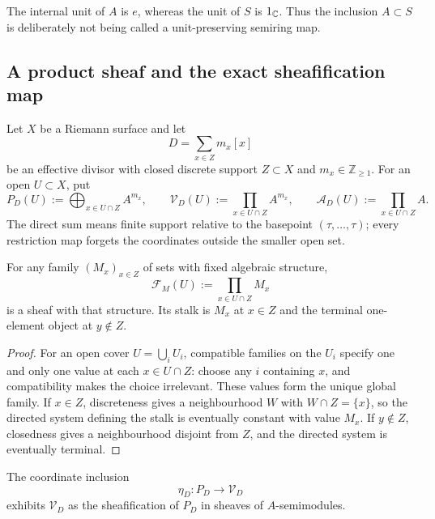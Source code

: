 The internal unit of $A$ is $e$, whereas the unit of $S$ is $1_{\mathbb C}$.  Thus the
inclusion $A\subset S$ is deliberately not being called a unit-preserving semiring
map.

\subsection{A product sheaf and the exact sheafification map}

Let $X$ be a Riemann surface and let
\[
 D=\sum_{x\in Z}m_x[x]
\]
be an effective divisor with closed discrete support $Z\subset X$ and
$m_x\in\mathbb Z_{\geq1}$.  For an open $U\subset X$, put
\[
 P_D(U):=\bigoplus_{x\in U\cap Z}A^{m_x},
 \qquad
 \mathcal V_D(U):=\prod_{x\in U\cap Z}A^{m_x},
 \qquad
 \mathcal A_D(U):=\prod_{x\in U\cap Z}A.
\]
The direct sum means finite support relative to the basepoint
$(\tau,\ldots,\tau)$; every restriction map forgets the coordinates outside the
smaller open set.

\begin{lemma}
\label{lem:ds-product-sheaf}
For any family $(M_x)_{x\in Z}$ of sets with fixed algebraic structure,
\[
 \mathcal F_M(U):=\prod_{x\in U\cap Z}M_x
\]
is a sheaf with that structure.  Its stalk is $M_x$ at $x\in Z$ and the terminal
one-element object at $y\notin Z$.
\end{lemma}

\begin{proof}
For an open cover $U=\bigcup_iU_i$, compatible families on the $U_i$ specify
one and only one value at each $x\in U\cap Z$: choose any $i$ containing $x$,
and compatibility makes the choice irrelevant.  These values form the unique
global family.  If $x\in Z$, discreteness gives a neighbourhood $W$ with
$W\cap Z=\{x\}$, so the directed system defining the stalk is eventually
constant with value $M_x$.  If $y\notin Z$, closedness gives a neighbourhood
disjoint from $Z$, and the directed system is eventually terminal.
\end{proof}

\begin{theorem}
\label{thm:ds-sheafification}
The coordinate inclusion
\[
 \eta_D:P_D\longrightarrow\mathcal V_D
\]
exhibits $\mathcal V_D$ as the sheafification of $P_D$ in sheaves of
$A$-semimodules.
\end{theorem}

